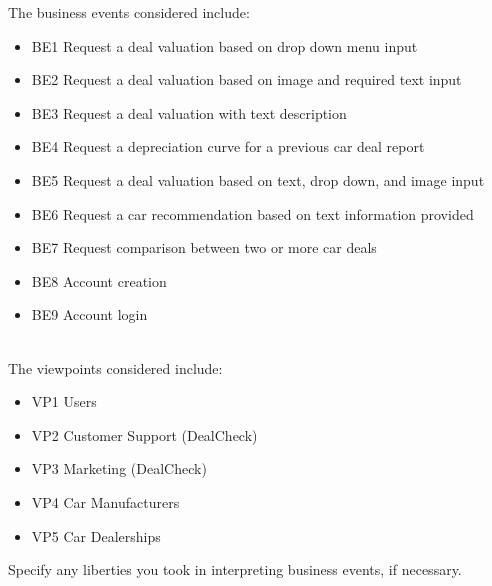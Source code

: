 \documentclass[]{article}
\begin{document}
\noindent The business events considered include:

\begin{itemize}
	\item BE1 Request a deal valuation based on drop down menu input
	\item BE2 Request a deal valuation based on image and required text input
	\item BE3 Request a deal valuation with text description
	\item BE4 Request a depreciation curve for a previous car deal report
	\item BE5 Request a deal valuation based on text, drop down, and image input
	\item BE6 Request a car recommendation based on text information provided
	\item BE7 Request comparison between two or more car deals
	\item BE8 Account creation
	\item BE9 Account login
\end{itemize}

 \\

\noindent The viewpoints considered include:

\begin{itemize}
	\item VP1 Users
	\item VP2 Customer Support (DealCheck)
	\item VP3 Marketing (DealCheck)
	\item VP4 Car Manufacturers
	\item VP5 Car Dealerships
\end{itemize}

 Specify any liberties you took in interpreting business events, if necessary. \\
\end{document}
